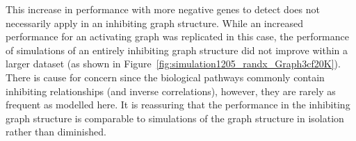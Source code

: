 
This increase in performance with more negative genes to detect does not necessarily apply in an inhibiting graph structure. While an increased performance for an activating graph was replicated in this case, the performance of simulations of an entirely inhibiting graph structure did not improve within a larger dataset (as shown in Figure~\ref{fig:simulation1205_randx_Graph3cf20K}). There is cause for concern since the biological pathways commonly contain inhibiting relationships (and inverse correlations), however, they are rarely as frequent as modelled here. It is reassuring that the performance in the inhibiting graph structure is comparable to simulations of the graph structure in isolation rather than diminished.


